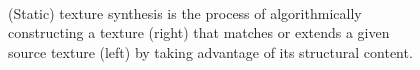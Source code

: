 \begin{figure}[t]
\begin{center}
	\\
	\caption[Texture synthesis]{(Static) texture synthesis is the process of algorithmically constructing a texture (right) that matches or extends a given source texture (left) by taking advantage of its structural content.}
	\vspace{-0.65cm}
	\label{fig:texture_synthesis}
\end{center}
\end{figure}